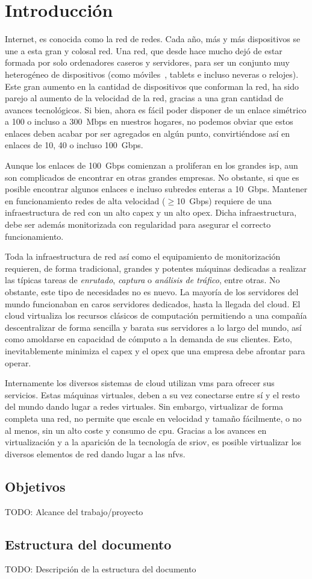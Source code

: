 \chapter{Introducción}

Internet, es conocida como la red de redes. Cada año, más y más dispositivos se une a esta gran y colosal red. Una red, que desde hace mucho dejó de estar formada por solo ordenadores caseros y servidores, para ser un conjunto muy heterogéneo de dispositivos (como móviles~\cite{bib:introduccion:smartphone}, tablets e incluso neveras o relojes). Este gran aumento en la cantidad de dispositivos que conforman la red, ha sido parejo al aumento de la velocidad de la red, gracias a una gran cantidad de avances tecnológicos. Si bien, ahora es fácil poder disponer de un enlace simétrico a 100 o incluso a 300~Mbps en nuestros hogares, no podemos obviar que estos enlaces deben acabar por ser agregados en algún punto, convirtiéndose así en enlaces de 10, 40 o incluso 100~Gbps.

Aunque los enlaces de 100~Gbps comienzan a proliferan en los grandes \gls{isp}, aun son complicados de encontrar en otras grandes empresas. No obstante, si que es posible encontrar algunos enlaces e incluso subredes enteras a 10~Gbps. Mantener en funcionamiento redes de alta velocidad ($\geq$10~Gbps) requiere de una infraestructura de red con un alto \gls{capex} y un alto \gls{opex}. Dicha infraestructura, debe ser además monitorizada con regularidad para asegurar el correcto funcionamiento.

Toda la infraestructura de red así como el equipamiento de monitorización requieren, de forma tradicional, grandes y potentes máquinas dedicadas a realizar las típicas tareas de \textit{enrutado}, \textit{captura} o \textit{análisis de tráfico}, entre otras. No obstante, este tipo de necesidades no es nuevo. La mayoría de los servidores del mundo funcionaban en caros servidores dedicados, hasta la llegada del \gls{cloud}. El \gls{cloud} virtualiza los recursos clásicos de computación permitiendo a una compañía descentralizar de forma sencilla y barata sus servidores a lo largo del mundo, así como amoldarse en capacidad de cómputo a la demanda de sus clientes. Esto, inevitablemente minimiza el \gls{capex} y el \gls{opex} que una empresa debe afrontar para operar.

Internamente los diversos sistemas de \gls{cloud} utilizan \glspl{vm} para ofrecer sus servicios. Estas máquinas virtuales, deben a su vez conectarse entre sí y el resto del mundo dando lugar a redes virtuales. Sin embargo, virtualizar de forma completa una red, no permite que escale en velocidad y tamaño fácilmente, o no al menos, sin un alto coste y consumo de \gls{cpu}. Gracias a los avances en virtualización y a la aparición de la tecnología de \gls{sriov}, es posible virtualizar los diversos elementos de red dando lugar a las \glspl{nfv}.

\section{Objetivos}

TODO: Alcance del trabajo/proyecto

\section{Estructura del documento}

TODO: Descripción de la estructura del documento
